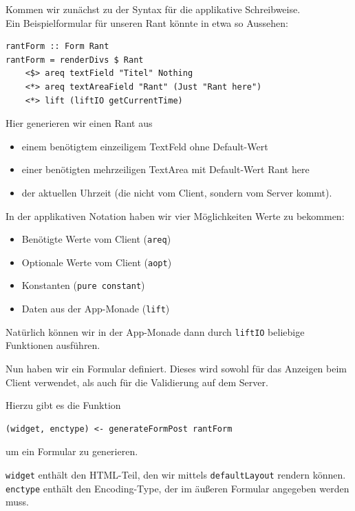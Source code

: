 \documentclass{beamer}
\begin{document}
\begin{frame}[fragile]
Kommen wir zunächst zu der Syntax für die applikative Schreibweise.\\\pause
Ein Beispielformular für unseren Rant könnte in etwa so Aussehen:
\begin{verbatim}
rantForm :: Form Rant
rantForm = renderDivs $ Rant
    <$> areq textField "Titel" Nothing
    <*> areq textAreaField "Rant" (Just "Rant here")
    <*> lift (liftIO getCurrentTime)
\end{verbatim}
\pause
Hier generieren wir einen Rant aus
\begin{itemize}
 \item einem benötigtem einzeiligem TextFeld ohne Default-Wert
 \item einer benötigten mehrzeiligen TextArea mit Default-Wert \glqq Rant here\grqq
 \item der aktuellen Uhrzeit (die nicht vom Client, sondern vom Server kommt).
\end{itemize}
\end{frame}

\begin{frame}[fragile]
In der applikativen Notation haben wir vier Möglichkeiten Werte zu bekommen:\pause
\begin{itemize}
 \item Benötigte Werte vom Client (\texttt{areq})
 \pause
 \item Optionale Werte vom Client (\texttt{aopt})
 \pause
 \item Konstanten (\texttt{pure constant})
 \pause
 \item Daten aus der App-Monade (\texttt{lift})
 \pause
\end{itemize}
\bigskip

Natürlich können wir in der App-Monade dann durch \texttt{liftIO} beliebige Funktionen ausführen.
\end{frame}

\begin{frame}[fragile]
Nun haben wir ein Formular definiert. Dieses wird sowohl für das Anzeigen beim Client verwendet, als auch für die Validierung auf dem Server.\\\par\pause

Hierzu gibt es die Funktion
\begin{verbatim}
(widget, enctype) <- generateFormPost rantForm
\end{verbatim}
um ein Formular zu generieren.\pause \\
\bigskip

\texttt{widget} enthält den HTML-Teil, den wir mittels \texttt{defaultLayout} rendern können. \texttt{enctype} enthält den Encoding-Type, der im äußeren Formular angegeben werden muss.
\end{frame}
\end{document}
